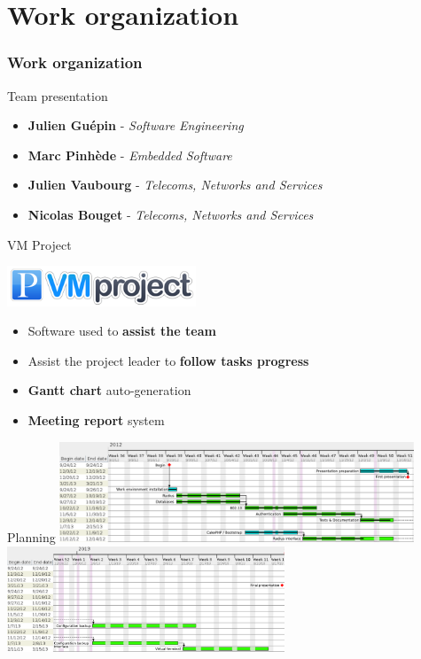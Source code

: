 \documentclass[12pt]{beamer}
\begin{document}
\part{Work organization}
\frame{\partpage}
\section{Work organization}

\begin{frame}{Team presentation}
    \begin{itemize}[<+->]
	\item {\bf Julien Guépin} - \emph{Software Engineering}
	\vfill
	\item {\bf Marc Pinhède} - \emph{Embedded Software}
	\vfill
	\item {\bf Julien Vaubourg} - \emph{Telecoms, Networks and Services}
	\vfill
	\item {\bf Nicolas Bouget} - \emph{Telecoms, Networks and Services}
    \end{itemize}
\end{frame}

\begin{frame}{VM Project}
    \begin{center}
    \includegraphics[width=160pt]{img/vmproject_logo.png}
    \end{center}
    \begin{itemize}[<+->]
	\item Software used to \textbf{assist the team}
    	\vfill
    	\item Assist the project leader to \textbf{follow tasks progress}
    	\vfill
    	\item \textbf{Gantt chart} auto-generation
    	\vfill
    	\item \textbf{Meeting report} system
    \end{itemize}
\end{frame}

\begin{frame}{Planning}
	\vfill
	\includegraphics[width=300pt]{img/gantt_en_part1.pdf}
	\vfill
	\includegraphics[height=90pt]{img/gantt_en_part2.pdf}
	\vfill
\end{frame}
\end{document}
